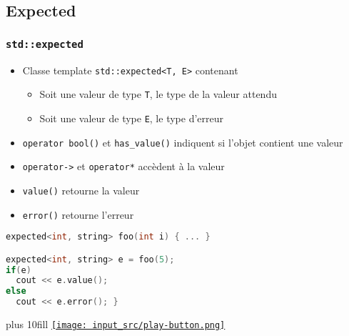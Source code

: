 \documentclass[C++.tex]{subfiles}
\begin{document}
\subsection*{Expected}
\begin{frame}[fragile]
	\frametitle{\lstinline|std::expected|}
	\begin{itemize}
		\item Classe template \lstinline|std::expected<T, E>| contenant
		\begin{itemize}
			\item Soit une valeur de type \lstinline|T|, le type de la valeur attendu
			\item Soit une valeur de type \lstinline|E|, le type d'erreur
		\end{itemize}
		\item \lstinline|operator bool()| et \lstinline|has_value()| indiquent si l'objet contient une valeur
		\item \lstinline|operator->| et \lstinline|operator*| accèdent à la valeur 
		\item \lstinline|value()| retourne la valeur
		\item \lstinline|error()| retourne l'erreur
	\end{itemize}

	\begin{lstlisting}[language=C++]
expected<int, string> foo(int i) { ... }

expected<int, string> e = foo(5);
if(e)
  cout << e.value();
else
  cout << e.error(); }\end{lstlisting}

	\vskip 5mm plus 10fill
	\hfill
	\href{https://godbolt.org/#g:!((g:!((g:!((h:codeEditor,i:(filename:'1',fontScale:14,fontUsePx:'0',j:1,lang:c%2B%2B,selection:(endColumn:1,endLineNumber:30,positionColumn:1,positionLineNumber:30,selectionStartColumn:1,selectionStartLineNumber:1,startColumn:1,startLineNumber:1),source:'%23include+%3Ciostream%3E%0A%23include+%3Cexpected%3E%0A%23include+%3Cstring%3E%0A%0Astd::expected%3Cint,+std::string%3E+foo(int+i)%0A%7B%0A++if(i+%3E+0)%0A++%7B%0A++++return+i%3B%0A++%7D%0A++else%0A++%7B%0A++++return+std::unexpected%7B%22Nul%22%7D%3B%0A++%7D%0A%7D%0A%0Aint+main()%0A%7B%0A++std::expected%3Cint,+std::string%3E+e+%3D+foo(5)%3B%0A%0A++if(e)%0A++%7B%0A++++std::cout+%3C%3C+%22Val+:+%22+%3C%3C+e.value()+%3C%3C+%22%5Cn%22%3B%0A++%7D%0A++else%0A++%7B%0A++++std::cout+%3C%3C+%22Erreur+:+%22+%3C%3C+e.error()+%3C%3C+%22%5Cn%22%3B%0A++%7D%0A%7D%0A'),l:'5',n:'0',o:'C%2B%2B+source+%231',t:'0')),k:50,l:'4',n:'0',o:'',s:0,t:'0'),(g:!((h:executor,i:(argsPanelShown:'1',compilationPanelShown:'0',compiler:g122,compilerName:'',compilerOutShown:'0',execArgs:'',execStdin:'',fontScale:14,fontUsePx:'0',j:1,lang:c%2B%2B,libs:!(),options:'-std%3Dc%2B%2B23+-Wall+-Wextra+-pedantic',source:1,stdinPanelShown:'1',wrap:'1'),l:'5',n:'0',o:'Executor+x86-64+gcc+12.2+(C%2B%2B,+Editor+%231)',t:'0')),header:(),k:50,l:'4',n:'0',o:'',s:0,t:'0')),l:'2',n:'0',o:'',t:'0')),version:4}{\texttt{[image: input\_src/play-button.png]}}
\end{frame}
\end{document}
